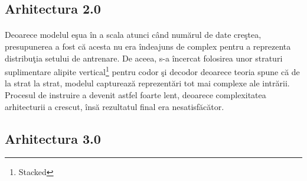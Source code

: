 \subsection{Arhitectura 2.0}

\paragraph{}
Deoarece modelul e\c sua \^ in a scala atunci c\^ and num\u arul de date cre\c stea, presupunerea a fost c\u a acesta nu era \^ indeajuns de complex pentru a reprezenta distribu\c tia setului de antrenare. De aceea, s-a \^ incercat folosirea unor straturi suplimentare alipite vertical\footnote{Stacked} pentru codor \c si decodor deoarece teoria spune c\u a de la strat la strat, modelul captureaz\u a reprezent\u ari tot mai complexe ale intr\u arii. Procesul de instruire a devenit astfel foarte lent, deoarece complexitatea arhitecturii a crescut, \^ ins\u a rezultatul final era nesatisf\u ac\u ator. 

\subsection{Arhitectura 3.0}

